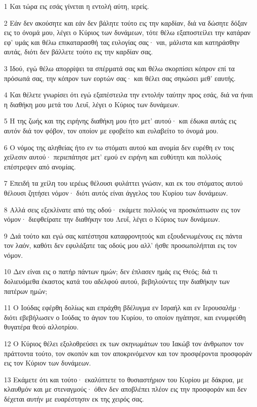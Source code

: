 \par 1 Και τώρα εις εσάς γίνεται η εντολή αύτη, ιερείς.
\par 2 Εάν δεν ακούσητε και εάν δεν βάλητε τούτο εις την καρδίαν, διά να δώσητε δόξαν εις το όνομά μου, λέγει ο Κύριος των δυνάμεων, τότε θέλω εξαποστείλει την κατάραν εφ' υμάς και θέλω επικαταρασθή τας ευλογίας σας· ναι, μάλιστα και κατηράσθην αυτάς, διότι δεν βάλλετε τούτο εις την καρδίαν σας.
\par 3 Ιδού, εγώ θέλω απορρίψει τα σπέρματά σας και θέλω σκορπίσει κόπρον επί τα πρόσωπά σας, την κόπρον των εορτών σας· και θέλει σας σηκώσει μεθ' εαυτής.
\par 4 Και θέλετε γνωρίσει ότι εγώ εξαπέστειλα την εντολήν ταύτην προς εσάς, διά να ήναι η διαθήκη μου μετά του Λευΐ, λέγει ο Κύριος των δυνάμεων.
\par 5 Η της ζωής και της ειρήνης διαθήκη μου ήτο μετ' αυτού· και έδωκα αυτάς εις αυτόν διά τον φόβον, τον οποίον με εφοβείτο και ευλαβείτο το όνομά μου.
\par 6 Ο νόμος της αληθείας ήτο εν τω στόματι αυτού και ανομία δεν ευρέθη εν τοις χείλεσιν αυτού· περιεπάτησε μετ' εμού εν ειρήνη και ευθύτητι και πολλούς επέστρεψεν από ανομίας.
\par 7 Επειδή τα χείλη του ιερέως θέλουσι φυλάττει γνώσιν, και εκ του στόματος αυτού θέλουσι ζητήσει νόμον· διότι αυτός είναι άγγελος του Κυρίου των δυνάμεων.
\par 8 Αλλά σεις εξεκλίνατε από της οδού· εκάμετε πολλούς να προσκόπτωσιν εις τον νόμον· διεφθείρατε την διαθήκην του Λευΐ, λέγει ο Κύριος των δυνάμεων.
\par 9 Διά τούτο και εγώ σας κατέστησα καταφρονητούς και εξουδενωμένους εις πάντα τον λαόν, καθότι δεν εφυλάξατε τας οδούς μου αλλ' ήσθε προσωπολήπται εις τον νόμον.
\par 10 Δεν είναι εις ο πατήρ πάντων ημών; δεν έπλασεν ημάς εις Θεός; διά τι δολιευόμεθα έκαστος κατά του αδελφού αυτού, βεβηλούντες την διαθήκην των πατέρων ημών;
\par 11 Ο Ιούδας εφέρθη δολίως και επράχθη βδέλυγμα εν Ισραήλ και εν Ιερουσαλήμ· διότι εβεβήλωσεν ο Ιούδας το άγιον του Κυρίου, το οποίον ηγάπησε, και ενυμφεύθη θυγατέρα θεού αλλοτρίου.
\par 12 Ο Κύριος θέλει εξολοθρεύσει εκ των σκηνωμάτων του Ιακώβ τον άνθρωπον τον πράττοντα τούτο, τον σκοπόν και τον αποκρινόμενον και τον προσφέροντα προσφοράν εις τον Κύριον των δυνάμεων.
\par 13 Εκάμετε ότι και τούτο· εκαλύπτετε το θυσιαστήριον του Κυρίου με δάκρυα, με κλαυθμόν και με στεναγμούς· όθεν δεν αποβλέπει πλέον εις την προσφοράν και δεν δέχεται αυτήν με ευαρέστησιν εκ της χειρός σας.
